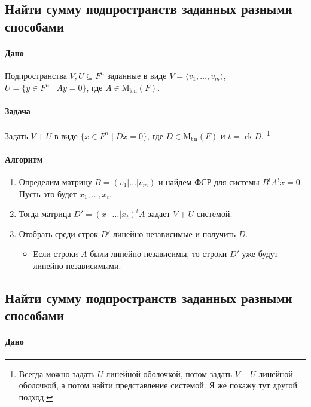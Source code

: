 \documentclass{article}
\newcommand{\MatrixDim}[3]{\operatorname{\mathrm{M}_{#2\,#3}}(#1)}
\newcommand{\rk}{\operatorname{rk}}
\begin{document}
\subsection{Найти сумму подпространств заданных разными способами}

\paragraph{Дано}

Подпространства $V,U\subseteq F^{n}$ заданные в виде $V =\langle v_1,\ldots,v_m\rangle$, $U = \{y\in F^{n}\mid Ay = 0\}$, где $A\in \MatrixDim{F}{k}{n}$.

\paragraph{Задача}

Задать $V + U$ в виде $\{x\in F^n \mid Dx = 0\}$, где $D\in \MatrixDim{F}{t}{n}$ и $t = \rk D$.%
\footnote{Всегда можно задать $U$ линейной оболочкой, потом задать $V+U$ линейной оболочкой, а потом найти представление системой.
Я же покажу тут другой подход.}

\paragraph{Алгоритм}

\begin{enumerate}
\item Определим матрицу $B = (v_1|\ldots|v_m)$ и найдем ФСР для системы $B^tA^t x = 0$.
Пусть это будет $x_1,\ldots, x_t$.

\item Тогда матрица $D' = (x_1|\ldots|x_t)^tA$ задает $V + U$ системой.

\item Отобрать среди строк $D'$ линейно независимые и получить $D$.
\begin{itemize}
\item Если строки $A$ были линейно независимы, то строки $D'$ уже будут линейно независимыми.
\end{itemize}
\end{enumerate}

\subsection{Найти сумму подпространств заданных разными способами}

\paragraph{Дано}
\end{document}
